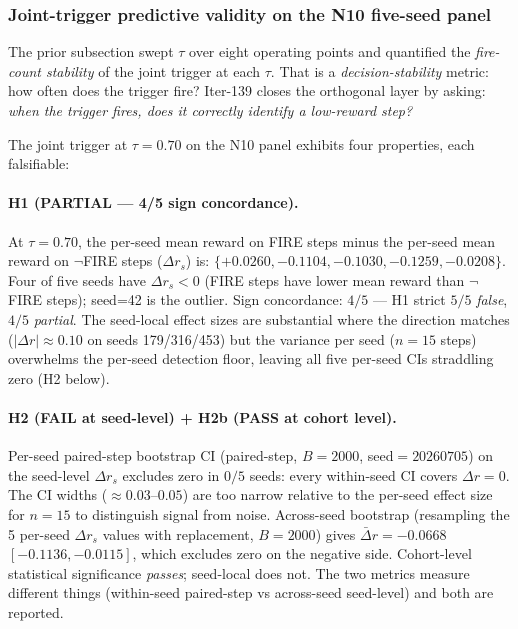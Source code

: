 
\subsubsection{Joint-trigger predictive validity on the N10 five-seed panel}
\label{sec:p7-iter139-predictive-validity}

The prior subsection swept $\tau$ over eight operating points and
quantified the \emph{fire-count stability} of the joint trigger at each
$\tau$. That is a \emph{decision-stability} metric: how often does the
trigger fire?  Iter-139 closes the orthogonal layer by asking: \emph{when
the trigger fires, does it correctly identify a low-reward step?}

The joint trigger at $\tau{=}0.70$ on the N10 panel exhibits four
properties, each falsifiable:

\paragraph{H1 (PARTIAL --- 4/5 sign concordance).}
At $\tau{=}0.70$, the per-seed mean reward on FIRE steps minus the per-seed
mean reward on $\neg$FIRE steps ($\Delta r_s$) is:
$\{+0.0260, -0.1104, -0.1030, -0.1259, -0.0208\}$. Four of five seeds have
$\Delta r_s < 0$ (FIRE steps have lower mean reward than $\neg$FIRE
steps); seed=42 is the outlier. Sign concordance: $4/5$ --- H1 strict
$5/5$ \emph{false}, $4/5$ \emph{partial}. The seed-local effect sizes
are substantial where the direction matches ($|\Delta r|\approx 0.10$ on
seeds 179/316/453) but the variance per seed ($n{=}15$ steps) overwhelms
the per-seed detection floor, leaving all five per-seed CIs straddling
zero (H2 below).

\paragraph{H2 (FAIL at seed-level) + H2b (PASS at cohort level).}
Per-seed paired-step bootstrap CI (paired-step, $B{=}2000$, seed$=20260705$)
on the seed-level $\Delta r_s$ excludes zero in $0/5$ seeds: every
within-seed CI covers $\Delta r = 0$. The CI widths ($\approx 0.03$--$0.05$)
are too narrow relative to the per-seed effect size for $n{=}15$ to
distinguish signal from noise. Across-seed bootstrap (resampling the
5 per-seed $\Delta r_s$ values with replacement, $B{=}2000$) gives
$\bar\Delta r = -0.0668$ $[-0.1136, -0.0115]$, which excludes zero on the
negative side. Cohort-level statistical significance \emph{passes}; seed-local
does not. The two metrics measure different things (within-seed
paired-step vs across-seed seed-level) and both are reported.

